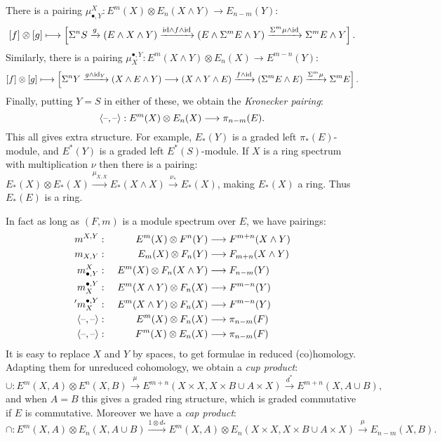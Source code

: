 \documentclass[11pt]{article}
\theoremstyle{plain}
\theoremstyle{definition}
\begin{document}
{There is a pairing 
$\mu^X_{\bullet,Y}:E^m(X)\otimes E_n(X\wedge Y)\to E_{n-m}(Y)$:
\[[f]\otimes[g]\longmapsto\left[\Sigma^nS\xrightarrow{g}(E\wedge X\wedge
Y)\xrightarrow{\textup{id}\wedge f\wedge\textup{id}}(E\wedge \Sigma^mE\wedge
Y)\xrightarrow{\Sigma^m\mu\wedge\textup{id}}\Sigma^mE\wedge Y\right].\]
Similarly, there is a pairing 
$\mu_X^{\bullet,Y}:E^m(X\wedge Y)\otimes E_n(X)\to E^{m-n}(Y)$:
\[[f]\otimes[g]\longmapsto\left[\Sigma^nY\xrightarrow{g\wedge\textup{id}_Y}(X\wedge E\wedge
Y)\longrightarrow(X\wedge Y\wedge E)\xrightarrow{f\wedge\textup{id}}(\Sigma^mE\wedge E
)\xrightarrow{\Sigma^m\mu}\Sigma^mE\right].\]
Finally, putting $Y=S$ in either of these, we obtain the \emph{Kronecker
pairing}:
\[\langle\textup{--},\textup{--}\rangle:E^m(X)\otimes E_n(X)\longrightarrow \pi_{n-m}(E).\]
This all gives extra structure. For example, $E_*(Y)$ is a graded left
$\pi_*(E)$-module, and $E^*(Y)$ is a graded left $E^*(S)$-module. If $X$ is a
ring spectrum with multiplication $\nu$ then there is a pairing: $E_*(X)\otimes
E_*(X)\xrightarrow{\mu_{X,X}}E_*(X\wedge X)\xrightarrow{\ \nu_* \ }E_*(X)$,
making $E_*(X)$ a ring. Thus $E_*(E)$ is a ring.

\label{modulestructures}
In fact as long as $(F,m)$ is a module spectrum over $E$, we have pairings:
\begin{alignat*}{2}
m^{X,Y}&:\,\,&E^m(X)\otimes F^n(Y)&\longrightarrow F^{m+n}(X\wedge Y)\\
m_{X,Y}&:&E_m(X)\otimes F_n(Y)&\longrightarrow F_{m+n}(X\wedge Y)\\
m^X_{\bullet,Y}&:&E^m(X)\otimes F_n(X\wedge Y)&\longrightarrow F_{n-m}(Y)\\
m_X^{\bullet,Y}&:&E^m(X\wedge Y)\otimes F_n(X)&\longrightarrow F^{m-n}(Y)\\
'm_X^{\bullet,Y}&:&E^m(X\wedge Y)\otimes F_n(X)&\longrightarrow F^{m-n}(Y)\\
\langle\textup{--},\textup{--}\rangle&:&E^m(X)\otimes F_n(X)&\longrightarrow \pi_{n-m}(F)\\
\langle\textup{--},\textup{--}\rangle&:&F^m(X)\otimes E_n(X)&\longrightarrow \pi_{n-m}(F)
\end{alignat*}
It is easy to replace $X$ and $Y$ by spaces, to get formulae in reduced
(co)homology. Adapting them for unreduced cohomology, we obtain a \emph{cup
product}:
\[\cup:E^m(X,A)\otimes E^n(X,B)\xrightarrow{\mu}E^{m+n}(X\times X,X\times B\cup
A\times X)\xrightarrow{d^*}E^{m+n}(X,A\cup B),\]
and when $A=B$ this gives a graded ring structure, which is graded commutative
if $E$ is commutative. Moreover we have a \emph{cap product}:
\[\cap:E^m(X,A)\otimes E_n(X,A\cup B)\xrightarrow{1\otimes d_*}E^m(X,A)\otimes
E_n(X\times X,X\times B\cup A\times X)\xrightarrow{\mu}E_{n-m}(X,B).\]

}
\end{document}
